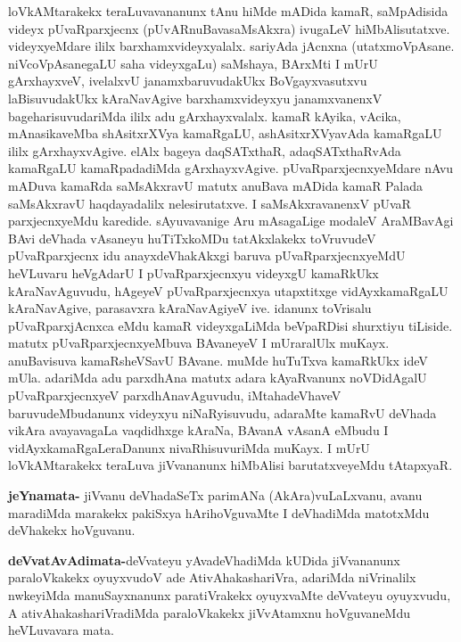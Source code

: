 \begin{artha}
loVkAMtarakekx teraLuvavananunx tAnu hiMde mADida kamaR, saMpAdisida videyx pUvaRparxjecnx (pUvARnuBavasaMsAkxra) ivugaLeV hiMbAlisutatxve. videyxyeMdare ililx barxhamxvideyxyalalx. sariyAda jAcnxna (utatxmoVpAsane. niVcoVpAsanegaLU saha videyxgaLu) saMshaya, BArxMti I mUrU gArxhayxveV, ivelalxvU janamxbaruvudakUkx BoVgayxvasutxvu laBisuvudakUkx kAraNavAgive barxhamxvideyxyu janamxvanenxV bageharisuvudariMda ililx adu gArxhayxvalalx.  kamaR kAyika, vAcika, mAnasikaveMba shAsitxrXVya kamaRgaLU, ashAsitxrXVyavAda kamaRgaLU ililx gArxhayxvAgive. elAlx bageya daqSATxthaR, adaqSATxthaRvAda kamaRgaLU kamaRpadadiMda gArxhayxvAgive. pUvaRparxjecnxyeMdare nAvu mADuva kamaRda saMsAkxravU matutx anuBava mADida kamaR Palada saMsAkxravU haqdayadalilx nelesirutatxve. I saMsAkxravanenxV pUvaR parxjecnxyeMdu karedide. sAyuvavanige Aru mAsagaLige modaleV AraMBavAgi BAvi deVhada vAsaneyu huTiTxkoMDu tatAkxlakekx toVruvudeV pUvaRparxjecnx idu anayxdeVhakAkxgi baruva pUvaRparxjecnxyeMdU heVLuvaru heVgAdarU I pUvaRparxjecnxyu videyxgU kamaRkUkx kAraNavAguvudu, hAgeyeV pUvaRparxjecnxya utapxtitxge vidAyxkamaRgaLU kAraNavAgive, parasavxra kAraNavAgiyeV ive. idanunx toVrisalu pUvaRparxjAcnxca eMdu kamaR videyxgaLiMda beVpaRDisi shurxtiyu tiLiside. matutx pUvaRparxjecnxyeMbuva BAvaneyeV I mUraralUlx muKayx. anuBavisuva kamaRsheVSavU BAvane. muMde huTuTxva kamaRkUkx ideV mUla. adariMda adu parxdhAna matutx adara kAyaRvanunx noVDidAgalU pUvaRparxjecnxyeV parxdhAnavAguvudu, iMtahadeVhaveV baruvudeMbudanunx videyxyu niNaRyisuvudu, adaraMte kamaRvU deVhada vikAra avayavagaLa vaqdidhxge kAraNa, BAvanA vAsanA eMbudu I vidAyxkamaRgaLeraDanunx nivaRhisuvuriMda muKayx. I mUrU loVkAMtarakekx teraLuva jiVvananunx hiMbAlisi barutatxveyeMdu tAtapxyaR.
\end{artha}



\begin{artha}
\textbf{jeYnamata-} jiVvanu deVhadaSeTx parimANa (AkAra)vuLaLxvanu, avanu maradiMda marakekx pakiSxya hArihoVguvaMte I deVhadiMda matotxMdu deVhakekx hoVguvanu.
\end{artha}

\begin{artha}
\textbf{deVvatAvAdimata-}deVvateyu yAvadeVhadiMda kUDida jiVvananunx paraloVkakekx oyuyxvudoV ade AtivAhakashariVra, adariMda niVrinalilx nwkeyiMda manuSayxnanunx paratiVrakekx oyuyxvaMte deVvateyu oyuyxvudu, A ativAhakashariVradiMda paraloVkakekx jiVvAtamxnu hoVguvaneMdu heVLuvavara mata.
\end{artha}

